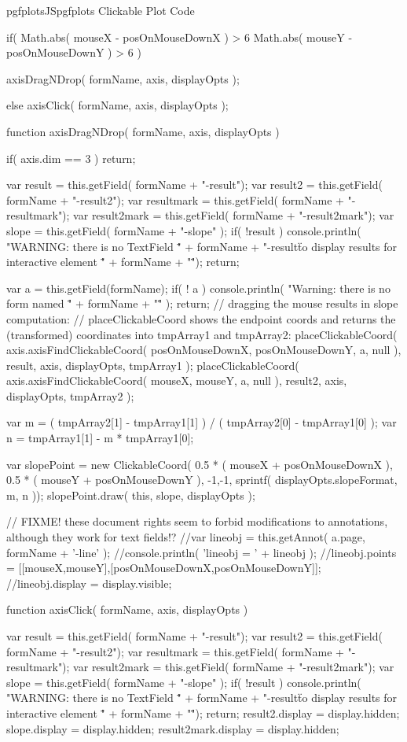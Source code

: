 {{\begin{insDLJS}[processAnnotatedPlot]{pgfplotsJS}{pgfplots Clickable Plot Code}
{	if( Math.abs( mouseX - posOnMouseDownX ) > 6 \pgfplotsVERTBAR\pgfplotsVERTBAR
		Math.abs( mouseY - posOnMouseDownY ) > 6 )
	{
		axisDragNDrop( formName, axis, displayOpts );

	} else {
		axisClick( formName, axis, displayOpts );
	}
}

function axisDragNDrop( formName, axis, displayOpts )
{
	if( axis.dim == 3 )
		return;

	var result = this.getField( formName + "-result");
	var result2 = this.getField( formName + "-result2");
	var resultmark = this.getField( formName + "-resultmark");
	var result2mark = this.getField( formName + "-result2mark");
	var slope 	= this.getField( formName + "-slope" );
	if( !result ) {
		console.println( "WARNING: there is no TextField \"" + formName + "-result\" to display results for interactive element \"" + formName + "\"");
		return;
	}

	var a = this.getField(formName);
	if( ! a ) {
		console.println( "Warning: there is no form named \"" + formName + "\"" );
		return;
	}
	// dragging the mouse results in slope computation:
	// placeClickableCoord shows the endpoint coords and returns the (transformed) coordinates into tmpArray1 and tmpArray2:
	placeClickableCoord( 
		axis.axisFindClickableCoord( posOnMouseDownX, posOnMouseDownY, a, null ),
		result, axis, displayOpts, tmpArray1 );
	placeClickableCoord( 
		axis.axisFindClickableCoord( mouseX, mouseY, a, null ),
		result2, axis, displayOpts, tmpArray2 );

	var m =  ( tmpArray2[1] - tmpArray1[1] ) / ( tmpArray2[0] - tmpArray1[0] );
	var n =  tmpArray1[1] - m * tmpArray1[0];

	var slopePoint = new ClickableCoord(
		0.5 * ( mouseX + posOnMouseDownX ),
		0.5 * ( mouseY + posOnMouseDownY ),
		-1,-1,
		sprintf( displayOpts.slopeFormat, m, n ));
	slopePoint.draw(
		this,
		slope,
		displayOpts );

	// FIXME! these document rights seem to forbid modifications to annotations, although they work for text fields!?
	//var lineobj = this.getAnnot( a.page, formName + '-line' );
	//console.println( 'lineobj = ' + lineobj );
	//lineobj.points = [[mouseX,mouseY],[posOnMouseDownX,posOnMouseDownY]];
	//lineobj.display = display.visible;
}

function axisClick( formName, axis, displayOpts )
{
	var result = this.getField( formName + "-result");
	var result2 = this.getField( formName + "-result2");
	var resultmark = this.getField( formName + "-resultmark");
	var result2mark = this.getField( formName + "-result2mark");
	var slope 	= this.getField( formName + "-slope" );
	if( !result ) {
		console.println( "WARNING: there is no TextField \"" + formName + "-result\" to display results for interactive element \"" + formName + "\"");
		return;
	}
	result2.display = display.hidden;
	slope.display = display.hidden;
	result2mark.display = display.hidden;

}
\end{insDLJS}}}
